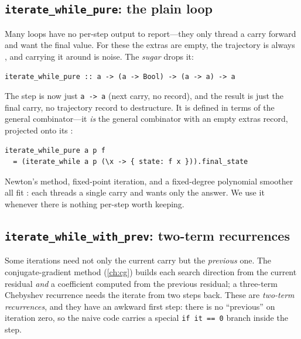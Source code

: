 \subsection{\texttt{iterate\_while\_pure}: the plain loop}

Many loops have no per-step output to report---they only thread a carry forward
and want the final value. For these the extras are empty, the trajectory is
always \code{[]}, and carrying it around is noise. The \emph{sugar}
 drops it:
\begin{lstlisting}[style=l4style]
iterate_while_pure :: a -> (a -> Bool) -> (a -> a) -> a
\end{lstlisting}
The step is now just \lstinline[style=l4style]|a -> a| (next carry, no record),
and the result is just the final carry, no trajectory record to destructure. It
is defined in terms of the general combinator---it \emph{is} the general
combinator with an empty extras record, projected onto its :
\begin{lstlisting}[style=l4style]
iterate_while_pure a p f
  = (iterate_while a p (\x -> { state: f x })).final_state
\end{lstlisting}
Newton's method, fixed-point iteration, and a fixed-degree polynomial smoother
all fit : each threads a single carry and wants only
the answer. We use it whenever there is nothing per-step worth keeping.

\subsection{\texttt{iterate\_while\_with\_prev}: two-term recurrences}

Some iterations need not only the current carry but the \emph{previous} one. The
conjugate-gradient method (\cref{ch:cg}) builds each search direction from the
current residual \emph{and} a coefficient computed from the previous residual;
a three-term Chebyshev recurrence needs the iterate from two steps back. These
are \emph{two-term recurrences}, and they have an awkward first step: there is no
``previous'' on iteration zero, so the naive code carries a special
\lstinline[style=l4style]|if it == 0| branch inside the step.

